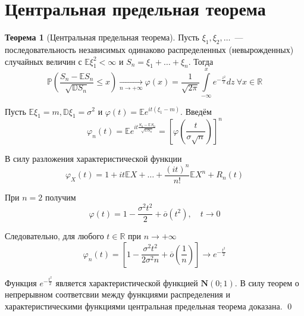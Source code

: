 \documentclass[oneside,final,14pt]{extreport}
\renewenvironment{proof}{{\bfseries Доказательство.}}{\qed}
\theoremstyle{plain}
\theoremstyle{definition}
\theoremstyle{named}
\newtheorem*{namedthm}{Теорема}
\begin{document}
\section{Центральная предельная теорема}
\begin{namedthm}[Центральная предельная теорема]
    Пусть $\xi_{1}, \xi_{2}, \ldots$~--- последовательность независимых одинаково распределенных (невырожденных) случайных величин с $\mathbb{E} \xi_{1}^{2}<\infty$ и $S_{n}=\xi_{1}+\ldots+\xi_{n}$. Тогда
    \begin{equation*}
        \mathbb{P}\left(\frac{S_{n}-\mathbb{E} S_{n}}{\sqrt{\mathbb{D} S_{n}}} \leqslant x\right)
        \xrightarrow[n \to +\infty]{}
        \varphi(x) = \frac{1}{\sqrt{2 \pi}} \int\limits_{-\infty}^{x} e^{-\frac{z^{2}}{2}} dz~ \forall x \in \mathbb{R}
    \end{equation*}
\end{namedthm}
\begin{proof}
Пусть $\mathbb{E} \xi_{1}=m, \mathbb{D} \xi_{1}=\sigma^{2}$ и $\varphi(t)=\mathbb{E} e^{i t\left(\xi_{1}-m\right)}$. Введём
\begin{equation*}
    \varphi_{n}(t)=\mathbb{E} e^{i t \frac{S_{n}-\mathbb{E} S_{n}}{\sqrt{\mathbb{D} S_{n}}}} = 
    \left[\varphi\left(\frac{t}{\sigma \sqrt{n}}\right)\right]^{n}
\end{equation*}

В силу разложения характеристической функции
\begin{equation*}
    \varphi_{X}(t)=1+i t \mathbb{E} X+\ldots+\frac{(i t)^{n}}{n !} \mathbb{E} X^{n}+R_{n}(t)
\end{equation*}

При $n=2$ получим 
\begin{equation*}
    \varphi(t)=1-\frac{\sigma^{2} t^{2}}{2}+\overline{o}\left(t^{2}\right), \quad t \rightarrow 0
\end{equation*}

Следовательно, для любого $t \in \mathbb{R}$ при $n \to +\infty$
\begin{equation*}
    \varphi_{n}(t)=\left[1-\frac{\sigma^{2} t^{2}}{2 \sigma^{2} n}+\overline{o}\left(\frac{1}{n}\right)\right] \rightarrow e^{-\frac{t^{2}}{2}}
\end{equation*}

Функция $e^{-\frac{t^{2}}{2}}$ является характеристической функцией $\mathbf{N}(0;1)$. В силу теорем о непрерывном соответсвии между функциями распределения и характеристическими функциями центральная предельная теорема доказана.
\end{proof}
\end{document}
